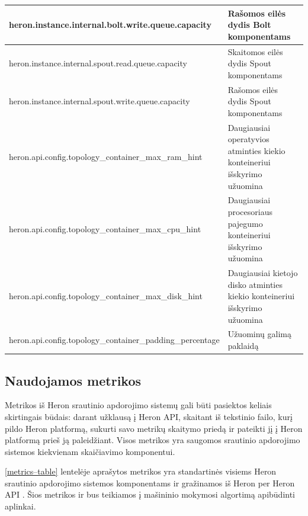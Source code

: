 \documentclass{VUMIFPSbakalaurinis}
\begin{document}
\begin{longtable}{|p{0.59\linewidth}|p{0.41\linewidth}|}
    heron.instance.internal.bolt.write.queue.capacity                     & Rašomos eilės dydis Bolt komponentams                                          \\ \hline
    heron.instance.internal.spout.read.queue.capacity                     & Skaitomos eilės dydis Spout komponentams                                       \\ \hline
    heron.instance.internal.spout.write.queue.capacity                    & Rašomos eilės dydis Spout komponentams                                         \\ \hline
    heron.api.config.topology\_container\_max\_ram\_hint                  & Daugiausiai operatyvios atminties kiekio konteineriui išskyrimo užuomina       \\ \hline
    heron.api.config.topology\_container\_max\_cpu\_hint                  & Daugiausiai procesoriaus pajegumo konteineriui išskyrimo užuomina              \\ \hline
    heron.api.config.topology\_container\_max\_disk\_hint                 & Daugiausiai kietojo disko atminties kiekio konteineriui  išskyrimo užuomina    \\ \hline
    heron.api.config.topology\_container\_padding\_percentage             & Užuominų galimą paklaidą                                                       \\ \hline
\end{longtable}

\subsection{Naudojamos metrikos}
Metrikos iš Heron srautinio apdorojimo sistemų gali būti pasiektos keliais skirtingais būdais: darant užklausą į Heron API, skaitant iš tekstinio failo, kurį pildo Heron platformą, sukurti savo metrikų skaitymo priedą ir pateikti jį į Heron platformą prieš ją paleidžiant. Visos metrikos yra saugomos srautinio apdorojimo sistemos kiekvienam skaičiavimo komponentui. 

\ref{metrics–table} lentelėje aprašytos metrikos yra standartinės visiems Heron srautinio apdorojimo sistemos komponentams ir gražinamos iš Heron per Heron API \cite{heronTracker}. Šios metrikos ir bus teikiamos į mašininio mokymosi algortimą apibūdinti aplinkai.
\end{document}

